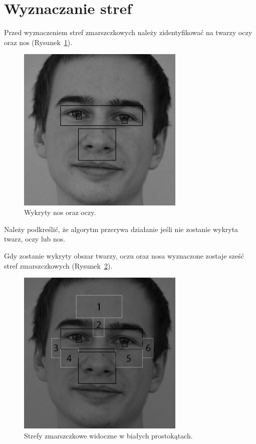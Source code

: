 \documentclass[a4paper,twoside,12pt]{book}
\begin{document}
    \section{Wyznaczanie stref}\label{sec:wyznaczanieStref}
    Przed wyznaczeniem stref zmarszczkowych należy zidentyfikować na twarzy oczy oraz nos
    (Rysunek~\ref{fig.wykrywanieOczuNosa}).
    \begin{figure}
        \centering
        \includegraphics[width=8cm]{Obrazy/wykrywanieOczuNosa.jpg}
        \caption{Wykryty nos oraz oczy.}
        \label{fig.wykrywanieOczuNosa}
    \end{figure}


    Należy podkreślić, że algorytm przerywa działanie jeśli nie zostanie wykryta twarz, oczy lub nos.

    Gdy zostanie wykryty obszar twarzy, oczu oraz nosa wyznaczone zostaje sześć stref zmarszczkowych
    (Rysunek~\ref{fig.wykrywanieStrefZmarszczkowych}).

    \begin{figure}
        \centering
        \includegraphics[width=8cm]{Obrazy/strefyZmarszczkowe.jpg}
        \caption{Strefy zmarszczkowe widoczne w białych prostokątach.}
        \label{fig.wykrywanieStrefZmarszczkowych}
    \end{figure}
\end{document}
